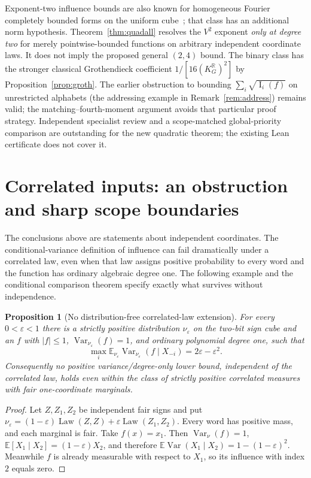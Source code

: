 \documentclass[11pt]{article}
\numberwithin{equation}{section}
\newtheorem{proposition}[theorem]{Proposition}
\theoremstyle{remark}
\newcommand{\Inf}{\operatorname{I}}
\begin{document}
Exponent-two influence bounds are also known for homogeneous Fourier completely bounded forms on the uniform cube~\cite[Theorem~1.6]{EG23}; that class has an additional norm hypothesis. Theorem~\ref{thm:quadall} resolves the $V^2$ exponent \emph{only at degree two} for merely pointwise-bounded functions on arbitrary independent coordinate laws. It does not imply the proposed general $(2,4)$ bound. The binary class has the stronger classical Grothendieck coefficient $1/[16(K_G^{\mathbb R})^2]$ by Proposition~\ref{prop:groth}. The earlier obstruction to bounding $\sum_i\sqrt{\Inf_i(f)}$ on unrestricted alphabets (the addressing example in Remark~\ref{rem:address}) remains valid; the matching--fourth-moment argument avoids that particular proof strategy. Independent specialist review and a scope-matched global-priority comparison are outstanding for the new quadratic theorem; the existing Lean certificate does not cover it.





\section{Correlated inputs: an obstruction and sharp scope boundaries}\label{sec:correlated}
The conclusions above are statements about independent coordinates. The
conditional-variance definition of influence can fail dramatically under
a correlated law, even when that law assigns positive probability to every
word and the function has ordinary algebraic degree one. The following
example and the conditional comparison theorem specify exactly what
survives without independence.

\begin{proposition}[No distribution-free correlated-law extension]\label{prop:corrno}
For every $0<\varepsilon<1$ there is a strictly positive distribution
$\nu_\varepsilon$ on the two-bit sign cube and an $f$ with $|f|\le1$,
$\operatorname{Var}_{\nu_\varepsilon}(f)=1$, and ordinary polynomial
degree one, such that
\[
 \max_i\mathbb E_{\nu_\varepsilon}
   \operatorname{Var}_{\nu_\varepsilon}(f\mid X_{-i})
 =2\varepsilon-\varepsilon^2.
\]
Consequently no positive variance/degree-only lower bound, independent of
the correlated law, holds even within the class of strictly positive
correlated measures with fair one-coordinate marginals.
\end{proposition}
\begin{proof}
Let $Z,Z_1,Z_2$ be independent fair signs and put
$\nu_\varepsilon=(1-\varepsilon)\operatorname{Law}(Z,Z)
+\varepsilon\operatorname{Law}(Z_1,Z_2)$.
Every word has positive mass, and each marginal is fair. Take $f(x)=x_1$.
Then $\operatorname{Var}_\nu(f)=1$, $\mathbb E[X_1\mid X_2]
=(1-\varepsilon)X_2$, and therefore
$\mathbb E\operatorname{Var}(X_1\mid X_2)
=1-(1-\varepsilon)^2$. Meanwhile $f$ is already measurable
with respect to $X_1$, so its influence with index $2$ equals zero.
\end{proof}
\end{document}

